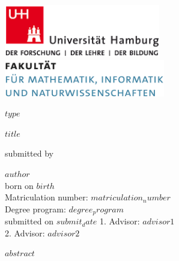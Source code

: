 \documentclass[a4paper,12pt]{article}
\begin{document}
\thispagestyle{empty}

\begin{titlepage}

\includegraphics[width=6.8cm]{images/uhh_logo.png}
\hspace{2cm}
\includegraphics[width=7cm]{images/min_logo.png}

\begin{center}\large
  \vfill
	{\Large{$type$}\\\vspace{0.5cm}\par\bigskip}
	\makeatletter
	{\LARGE\textsf{\textbf{$title$}}\par}
	\makeatother
	\vfill
  submitted by \\\vspace{0.5cm}
  \par\bigskip
	\makeatletter
  \textbf{$author$} \\
  \makeatother
  born on $birth$ \\
  Matriculation number: $matriculation_number$ \\
  Degree program: $degree_program$ \\
  \vfill
	\makeatletter
	submitted on $submit_date$
	\makeatother
	\vfill
  1. Advisor: $advisor1$ \\
  2. Advisor: $advisor2$ \\

\end{center}
\end{titlepage}


\newpage
\renewcommand{\contentsname}{Table of Content}
\tableofcontents
\clearpage

\newpage
$abstract$
\pagestyle{plain}
\setcounter{page}{1}    				%
\end{document}
